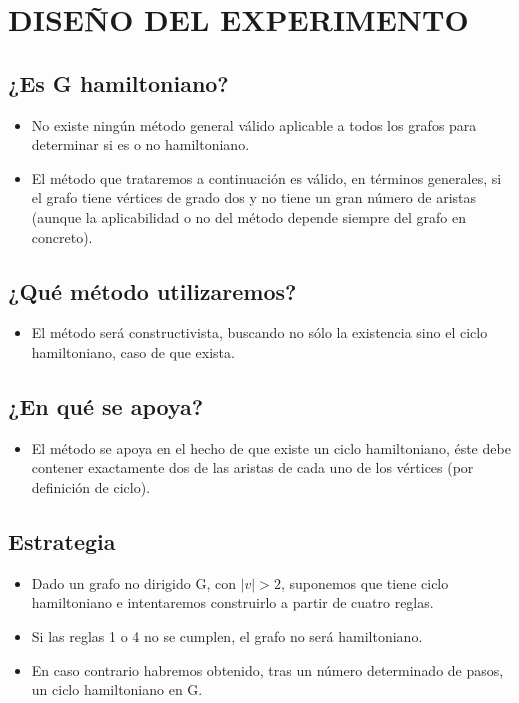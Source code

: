 \documentclass[journal]{IEEEtran}
\begin{document}

\section{\large\bf DISE\~{N}O DEL EXPERIMENTO}
\subsection{¿Es G hamiltoniano?}
\begin{itemize}
	\item No existe ningún método general v{\'a}lido aplicable a todos los grafos para determinar si es o no hamiltoniano.
	\item	El m{\'e}todo que trataremos a continuaci{\'o}n es válido, en t{\'e}rminos generales, si el grafo tiene v{\'e}rtices de grado dos y no tiene un gran n{\'u}mero de aristas (aunque la aplicabilidad o no del m{\'e}todo depende siempre del grafo en concreto).
\end{itemize}

\subsection{¿Qué m{\'e}todo utilizaremos?}
\begin{itemize}
	\item El m{\'e}todo será constructivista, buscando no s{\'o}lo la existencia sino el ciclo hamiltoniano, caso de que exista.
\end{itemize}

\subsection{¿En qu{\'e} se apoya?}
\begin{itemize}
	\item El m{\'e}todo se apoya en el hecho de que existe un ciclo hamiltoniano, éste debe contener exactamente dos de las aristas de cada uno de los v{\'e}rtices (por definición de ciclo).
\end{itemize}

\subsection{Estrategia}
\begin{itemize}
	\item	Dado un grafo no dirigido G, con $|v|>2$, suponemos que tiene ciclo hamiltoniano e intentaremos construirlo a partir de cuatro reglas.
	\item	Si las reglas 1 o 4 no se cumplen, el grafo no ser{\'a} hamiltoniano.
	\item En caso contrario habremos obtenido, tras un n{\'u}mero determinado de pasos, un ciclo hamiltoniano en G.
\end{itemize}
\end{document}
